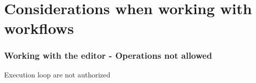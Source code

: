 \section{Considerations when working with workflows}
\begin{frame}
    \frametitle{Working with the editor - Operations not allowed}
    Execution loop are not authorized
    \vspace*{1em}
    \begin{columns}
        \begin{column}{0.7\textwidth}
        \end{column}
        \begin{column}{0.3\textwidth}
        \end{column}
    \end{columns}
\end{frame}

